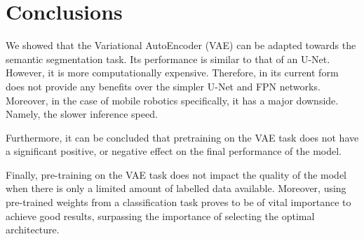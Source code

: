 \chapter{Conclusions}\label{chapter:conclusions}

We showed that the Variational AutoEncoder (VAE) can be adapted towards the semantic segmentation task. Its performance is similar to that of an U-Net. However, it is more computationally expensive. Therefore, in its current form does not provide any benefits over the simpler U-Net and FPN networks. Moreover, in the case of mobile robotics specifically, it has a major downside. Namely, the slower inference speed.

Furthermore, it can be concluded that pretraining on the VAE task does not have a significant positive, or negative effect on the final performance of the model. 

Finally, pre-training on the VAE task does not impact the quality of the model when there is only a limited amount of labelled data available. Moreover, using pre-trained weights from a classification task proves to be of vital importance to achieve good results, surpassing the importance of selecting the optimal architecture.
